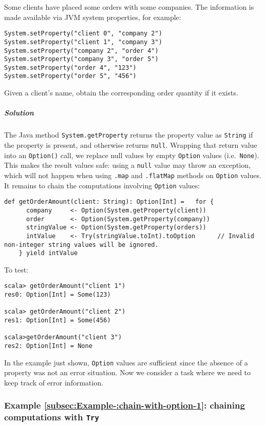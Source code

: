 Some clients have placed some orders with some companies. The information
is made available via JVM system properties, for example:
\begin{lstlisting}
System.setProperty("client 0", "company 2")
System.setProperty("client 1", "company 3")
System.setProperty("company 2", "order 4")
System.setProperty("company 3", "order 5")
System.setProperty("order 4", "123")
System.setProperty("order 5", "456")
\end{lstlisting}
Given a client\textsf{'}s name, obtain the corresponding order quantity if
it exists.

\subparagraph{Solution}

The Java method \lstinline!System.getProperty! returns the property
value as \lstinline!String! if the property is present, and otherwise
returns \lstinline!null!. Wrapping that return value into an \lstinline!Option()!
call, we replace null values by empty \lstinline!Option! values (i.e.~\lstinline!None!).
This makes the result values safe: using a \lstinline!null! value
may throw an exception, which will not happen when using \lstinline!.map!
and \lstinline!.flatMap! methods on \lstinline!Option! values. It
remains to chain the computations involving \lstinline!Option! values:

\begin{lstlisting}
def getOrderAmount(client: String): Option[Int] =   for {
      company     <- Option(System.getProperty(client))
      order       <- Option(System.getProperty(company))
      stringValue <- Option(System.getProperty(orders))
      intValue    <- Try(stringValue.toInt).toOption      // Invalid non-integer string values will be ignored.
    } yield intValue
\end{lstlisting}

To test:
\begin{lstlisting}
scala> getOrderAmount("client 1")
res0: Option[Int] = Some(123)

scala> getOrderAmount("client 2")
res1: Option[Int] = Some(456)

scala>getOrderAmount("client 3")
res2: Option[Int] = None
\end{lstlisting}

In the example just shown, \lstinline!Option! values are sufficient
since the absence of a property was not an error situation. Now we
consider a task where we need to keep track of error information.

\subsubsection{Example \label{subsec:Example-:chain-with-option-1}\ref{subsec:Example-:chain-with-option-1}:
chaining computations with \texttt{Try}}

